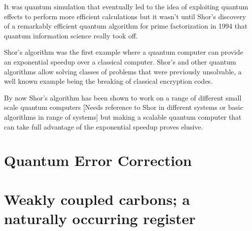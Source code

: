 It was quantum simulation that eventually led to the idea of exploiting quantum effects to perform more efficient calculations but it wasn't until Shor's discovery of a remarkably efficient quantum algorithm for prime factorization in 1994\citep{Shor1994Algorithms} that quantum information science really took off.

Shor's algorithm was the first example where a quantum computer can provide an exponential speedup over a classical computer. Shor's and other quantum algorithms allow solving classes of problems that were previously unsolvable, a well known example being the breaking of classical encryption codes.


By now Shor's algorithm has been shown to work on a range of different small scale quantum computers \cite{Vandersypen2001Experimental} [Needs reference to Shor in different systems or basic algorithms in range of systems] but making a scalable quantum computer that can take full advantage of the exponential speedup proves elusive.




\section{Quantum Error Correction}



\section{Weakly coupled carbons; a naturally occurring register }

